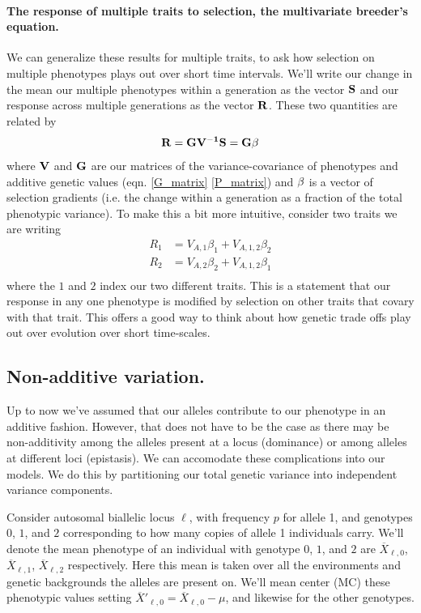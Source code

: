 \paragraph{The response of multiple traits to selection, the
  multivariate breeder's equation.}
We can generalize these results for multiple traits, to ask how selection on
multiple phenotypes plays out over short time intervals. We'll write
our change in the mean our multiple phenotypes within a generation as
the vector $\bf{S}$ and our response across multiple generations as
the vector $\bf{R}$. These two quantities are related by 
\begin{equation}
\bf{R} = \bf{G} \bf{V}^{-1} \bf{S} = \bf{G} \bf{\beta}
\end{equation}
 where $\bf{V}$ and $\bf{G}$ are our matrices of the
 variance-covariance of phenotypes and additive genetic values
 (eqn. \eqref{G_matrix} \eqref{P_matrix}) and
 $\bf{\beta}$ is a vector of selection gradients (i.e. the change
 within a generation as a fraction of the total phenotypic variance).
To make this a bit more intuitive, consider two traits we are writing 
\begin{eqnarray}
R_1 & = V_{A,1} \beta_1 + V_{A,1,2} \beta_2 \nonumber \\
R_2 & = V_{A,2} \beta_2 + V_{A,1,2} \beta_1  \nonumber \\
\end{eqnarray}
where the $1$ and $2$ index our two different traits. This is a
statement that our response in any one phenotype is modified by
selection on other traits that covary with that trait.
This offers a good way to think about how genetic trade offs play out
over evolution over short time-scales.

\newpage
\subsection{Non-additive variation.}
Up to now we've assumed that our alleles contribute to our phenotype
in an additive fashion. However, that does not have to be the case as
there may be non-additivity among the alleles present at a locus
(dominance) or among alleles at different loci (epistasis). We can accomodate these complications into our models. We do this by
partitioning our total genetic variance into independent variance
components.

Consider autosomal biallelic locus $\ell$, with frequency $p$ for allele 1, and
genotypes $0$, $1$, and $2$ corresponding to how many copies of allele
1 individuals carry. We'll denote the mean phenotype of an individual
with genotype $0$, $1$, and $2$ are $\overline{X}_{\ell,0}$,
$\overline{X}_{\ell,1}$, $\overline{X}_{\ell,2}$ respectively. Here this mean is
taken over all the environments and genetic backgrounds the alleles
are present on. We'll mean center (MC)
these phenotypic values setting $\overline{X}'_{\ell,0} = \overline{X}_{\ell,0} - \mu$, and
likewise for the other genotypes. 

